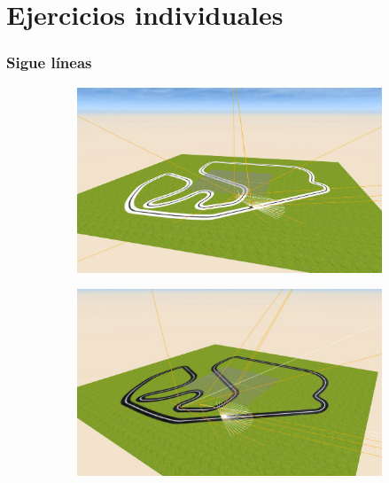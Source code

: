 \documentclass[xcolor={table}]{beamer}
\begin{document}
		\section{Ejercicios individuales}
		\begin{frame}
			\frametitle{Sigue líneas}
        		\begin{figure}[H]
                \centering
                \begin{subfigure}{\textwidth}
                 \includegraphics[scale=0.15]{img/siguelineas_ir.JPG}
                 \label{fig:ir}
                \end{subfigure}
                \begin{subfigure}{\textwidth}
                 \includegraphics[scale=0.15]{img/pibot_vision.JPG}
                \label{fig:vision}
                \end{subfigure}
                \end{figure}
        \end{frame}
		
\end{document}
